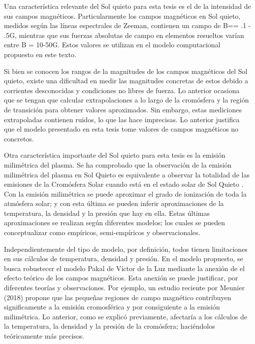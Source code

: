 Una caracter\'istica relevante del Sol quieto para esta tesis es el de la intensidad de sus campos magn\'eticos. Particularmente los campos magn\'eticos en Sol quieto, medidos seg\'un las l\'ineas espectrales de Zeeman, contienen un campo de B== .1 - .5G, mientras que sus fuerzas absolutas de campo en elementos resueltos var\'ian entre B = 10-50G. Estos valores se utilizan en el modelo computacional propuesto en este texto.

Si bien se conocen los rangos de la magnitudes de los campos magn\'eticos del Sol quieto, existe una dificultad en medir las magnitudes concretas de estos debido a corrientes desconocidas y condiciones no libres de fuerza. Lo anterior ocasiona que se tengan que calcular extrapolaciones a lo largo de la crom\'osfera y la regi\'on de transici\'on para obtener valores aproximados. Sin embargo, estas mediciones extrapoladas contienen ruidos, lo que las hace imprecisas. Lo anterior justifica que el modelo presentado en esta tesis tome valores de campos magn\'eticos no concretos.

Otra caracter\'istica importante del Sol quieto para esta tesis es la emisi\'on milim\'etrica del plasma. Se ha comprobado que la observaci\'on de la emisi\'on milim\'etrica del plasma en Sol Quieto es equivalente a observar la totalidad de las emisiones de la Crom\'osfera Solar cuando est\'a en el estado solar de Sol Quieto \citep{millimeter}. Con la emisi\'on milim\'etrica se puede aproximar el grado de ionizaci\'on de toda la atm\'osfera solar; y con esta \'ultima se pueden inferir aproximaciones de la temperatura, la densidad y la presi\'on que hay en ella. Estas \'ultimas aproximaciones se realizan seg\'un diferentes modelos; los cuales se pueden conceptualizar como emp\'iricos, semi-emp\'iricos y observacionales. 

Independientemente del tipo de modelo, por definici\'on, todos tienen limitaciones en sus c\'alculos de temperatura, densidad y presi\'on. En el modelo propuesto, se busca robustecer el modelo Pakal de V\'ictor de la Luz mediante la anexi\'on de el efecto te\'orico de los campos magn\'eticos. Esta anexi\'on se puede justificar, por diferentes teor\'ias y observaciones. Por ejemplo, un estudio reciente por Meunier (2018) propone que las peque\~nas regiones de campo magn\'etico contribuyen significamente a la emisi\'on cromosf\'erica y por consiguiente a la emisi\'on milim\'etrica. Lo anterior, como se explic\'o previamente, afectar\'ia a los c\'alculos de la temperatura, la densidad y la presi\'on de la crom\'osfera; haci\'endolos te\'oricamente m\'as precisos.
